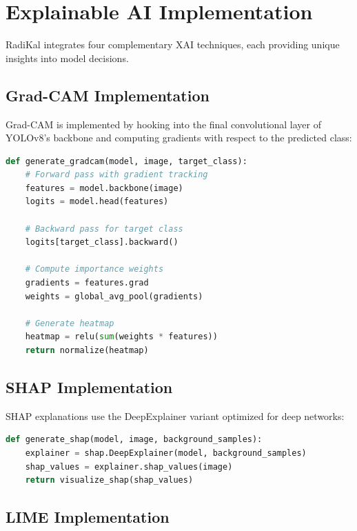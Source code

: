 \documentclass[12pt,a4paper]{report}
\begin{document}
\section{Explainable AI Implementation}

RadiKal integrates four complementary XAI techniques, each providing unique insights into model decisions.

\subsection{Grad-CAM Implementation}

Grad-CAM is implemented by hooking into the final convolutional layer of YOLOv8's backbone and computing gradients with respect to the predicted class:

\begin{lstlisting}[language=Python, caption=Grad-CAM Implementation Pseudocode]
def generate_gradcam(model, image, target_class):
    # Forward pass with gradient tracking
    features = model.backbone(image)
    logits = model.head(features)
    
    # Backward pass for target class
    logits[target_class].backward()
    
    # Compute importance weights
    gradients = features.grad
    weights = global_avg_pool(gradients)
    
    # Generate heatmap
    heatmap = relu(sum(weights * features))
    return normalize(heatmap)
\end{lstlisting}

\subsection{SHAP Implementation}

SHAP explanations use the DeepExplainer variant optimized for deep networks:

\begin{lstlisting}[language=Python, caption=SHAP Implementation Pseudocode]
def generate_shap(model, image, background_samples):
    explainer = shap.DeepExplainer(model, background_samples)
    shap_values = explainer.shap_values(image)
    return visualize_shap(shap_values)
\end{lstlisting}

\subsection{LIME Implementation}
\end{document}
